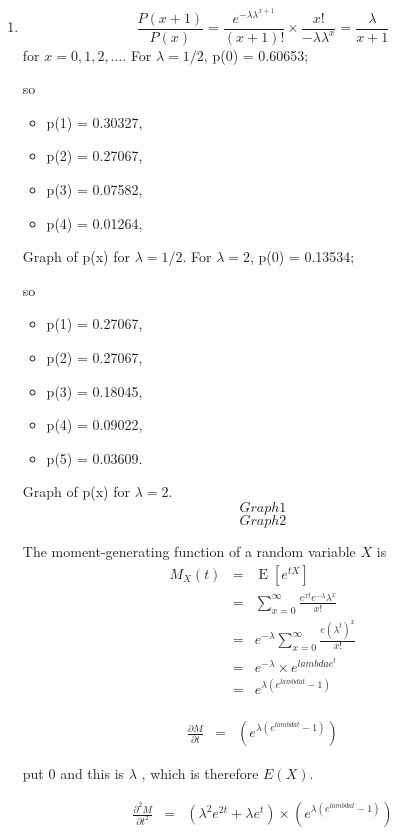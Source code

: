 \documentclass[a4paper,12pt]{article}
\begin{document}
\begin{enumerate}
\item 

\[ \frac{P(x+1)}{P(x)}  = \frac{e^{-\lambda \lambda^{x+1}}}{(x+1)!} \times \frac{x!}{-\lambda \lambda^{x}} = \frac{\lambda}{x+1}\]
  for $x = 0, 1, 2, \ldots $.
\medskip
For $\lambda = 1/2$, p(0) = 0.60653;

so
\begin{itemize}
\item p(1) = 0.30327,
\item p(2) = 0.27067,
\item p(3) = 0.07582, 
\item p(4) = 0.01264,
\end{itemize}
Graph of p(x) for $\lambda = 1/2$.
For $\lambda = 2$, p(0) = 0.13534;

so
\begin{itemize}
\item p(1) = 0.27067,
\item p(2) = 0.27067,
\item p(3) = 0.18045, 
\item p(4) = 0.09022,
\item p(5) = 0.03609.
\end{itemize}

Graph of p(x) for $\lambda = 2$.
\[ Graph 1\]
\[Graph 2 \]
  
\noindent The moment-generating function of a random variable $X$ is 
\begin{eqnarray*}   
M_{X}(t) &=& \operatorname {E} \left[e^{tX}\right] \\
&=& \sum^{\infty}_{x=0} \frac{e^{xt}e^{-\lambda} \lambda^x}{x!}\\
&=&  e^{-\lambda} \sum^{\infty}_{x=0} \frac{e (\lambda^{t})^x}{x!}\\
&=& e^{-\lambda} \times e^{lambda e^{t} } \\
&=& e^{\lambda(e^{lambda t} - 1)}\\
\end{eqnarray*}

\smallskip

\begin{eqnarray*} 
\frac{\partial M}{\partial t} &=&  \left(e^{\lambda(e^{lambda t} - 1) } \right)
\end{eqnarray*}

 put 0 and this is $\lambda$ , which is therefore $E(X)$.

\begin{eqnarray*} 
\frac{\partial^2M}{\partial t^2} &=& \left( \lambda^2 e^{2t} + \lambda e^{t} \right) \times \left(e^{\lambda(e^{lambda t} - 1) } \right)
\end{eqnarray*}


\end{enumerate}
\end{document}
